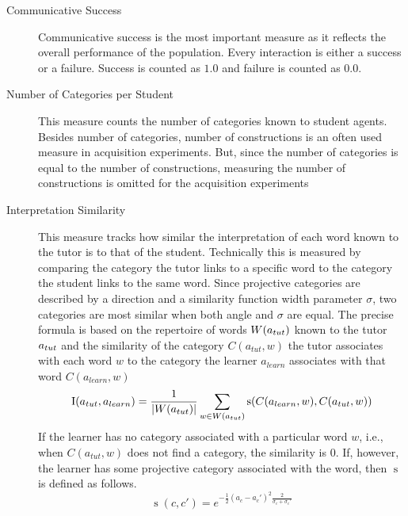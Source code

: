 \begin{description}
\item[Communicative Success] Communicative success is the most important
measure as it reflects the overall performance of the population. Every interaction
is either a success or a failure. Success is counted as $1.0$ and failure 
is counted as $0.0$. 
\item[Number of Categories per Student] This measure counts 
the number of categories known to student agents. 
Besides number of categories, number of constructions is an often
used measure in acquisition experiments.
But, since the number of categories is equal to the number of constructions, 
measuring the number of constructions is omitted for the acquisition experiments
\item[Interpretation Similarity] This measure tracks how similar the 
interpretation of each word known to the tutor is to that of the student. 
Technically this is measured by comparing the category the tutor links
to a specific word to the category the student links to the same word.
Since projective categories are described by a direction and a similarity function 
width parameter $\sigma$, two categories are most similar when both angle 
and $\sigma$ are equal. The precise formula is based on the repertoire of 
words $W(a_\mathnormal{tut})$ known to the tutor 
$a_\mathnormal{tut}$ and the similarity of the category $C(a_{tut},w)$ the tutor 
associates with each word $w$ to the category the learner $a_{learn}$
associates with that word $C(a_{learn},w)$
\begin{equation*}
\operatorname{I} (a_{tut},a_{learn}) 
= 
\frac{1}{|W(a_{tut})|}\sum_{w \in W(a_\mathnormal{tut})} 
\operatorname{s} (C(a_{learn},w),C(a_{tut},w))
\end{equation*}
If the learner has no category associated with a particular word $w$, i.e., when $C(a_{tut},w)$ 
does not find a category, the similarity is $0$. If, however, the learner has some projective category
associated with the word, then $\operatorname{s}$ is defined as follows.
\begin{equation*}
\operatorname{s}(c,c')=e^{-\frac{1}{2}(a_c - a_c')^2\frac{2}{\sigma_c + \sigma_c'}}
\end{equation*}
\end{description}

